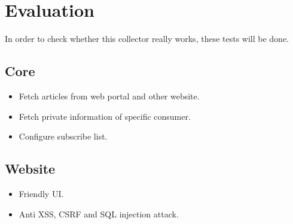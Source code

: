 \section{Evaluation}
  In order to check whether this collector really works, these tests will be done.
  \subsection{Core}
    \begin{itemize}
      \item[]{Fetch articles from web portal and other website.}
      \item[]{Fetch private information of specific consumer.}
      \item[]{Configure subscribe list.}
    \end{itemize}
  \subsection{Website}
    \begin{itemize}
      \item[]{Friendly UI.}
      \item[]{Anti XSS, CSRF and SQL injection attack.}
    \end{itemize}
